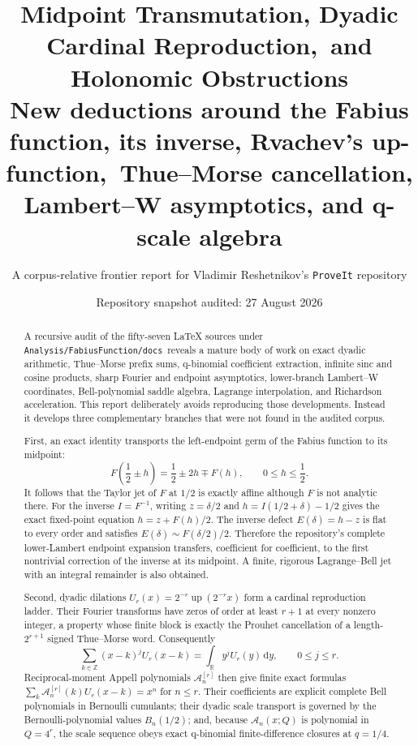 \documentclass[11pt,oneside]{article}
\title{\bfseries Midpoint Transmutation, Dyadic Cardinal Reproduction,\
and Holonomic Obstructions\\[0.4em]
\large New deductions around the Fabius function, its inverse, Rvachev's up-function,\
Thue--Morse cancellation, Lambert--W asymptotics, and q-scale algebra}
\author{A corpus-relative frontier report for Vladimir Reshetnikov's \texttt{ProveIt} repository}
\date{Repository snapshot audited: 27 August 2026}
\theoremstyle{definition}
\theoremstyle{remark}
\newcommand{\R}{\mathbb R}
\newcommand{\Z}{\mathbb Z}
\newcommand{\Up}{\operatorname{up}}
\newcommand{\dd}{\,\mathrm d}
\newcommand{\repo}{\nolinkurl{Analysis/FabiusFunction/docs}}
\newcommand{\Acard}{\mathcal A}
\begin{document}
\maketitle

\begin{abstract}
A recursive audit of the fifty-seven \LaTeX{} sources under \repo\ reveals a mature body of work on exact dyadic arithmetic, Thue--Morse prefix sums, q-binomial coefficient extraction, infinite sinc and cosine products, sharp Fourier and endpoint asymptotics, lower-branch Lambert--W coordinates, Bell-polynomial saddle algebra, Lagrange interpolation, and Richardson acceleration.  This report deliberately avoids reproducing those developments.  Instead it develops three complementary branches that were not found in the audited corpus.

First, an exact identity transports the left-endpoint germ of the Fabius function to its midpoint:
\[
 F\!\left(\frac12\pm h\right)=\frac12\pm2h\mp F(h),\qquad 0\le h\le\frac12.
\]
It follows that the Taylor jet of $F$ at $1/2$ is exactly affine although $F$ is not analytic there.  For the inverse $I=F^{-1}$, writing $z=\delta/2$ and
$h=I(1/2+\delta)-1/2$ gives the exact fixed-point equation
$h=z+F(h)/2$.  The inverse defect $E(\delta)=h-z$ is flat to every order and satisfies
$E(\delta)\sim F(\delta/2)/2$.  Therefore the repository's complete lower-Lambert endpoint expansion transfers, coefficient for coefficient, to the first nontrivial correction of the inverse at its midpoint.  A finite, rigorous Lagrange--Bell jet with an integral remainder is also obtained.

Second, dyadic dilations $U_r(x)=2^{-r}\Up(2^{-r}x)$ form a cardinal reproduction ladder.  Their Fourier transforms have zeros of order at least $r+1$ at every nonzero integer, a property whose finite block is exactly the Prouhet cancellation of a length-$2^{r+1}$ signed Thue--Morse word.  Consequently
\[
 \sum_{k\in\Z}(x-k)^jU_r(x-k)=\int_{\R}y^jU_r(y)\dd y,
 \qquad 0\le j\le r.
\]
Reciprocal-moment Appell polynomials $\Acard_n^{[r]}$ then give finite exact formulas
$\sum_k\Acard_n^{[r]}(k)U_r(x-k)=x^n$ for $n\le r$.  Their coefficients are explicit complete Bell polynomials in Bernoulli cumulants; their dyadic scale transport is governed by the Bernoulli-polynomial values $B_n(1/2)$; and, because $\Acard_n(x;Q)$ is polynomial in $Q=4^r$, the scale sequence obeys exact q-binomial finite-difference closures at $q=1/4$.


\end{abstract}
\end{document}
